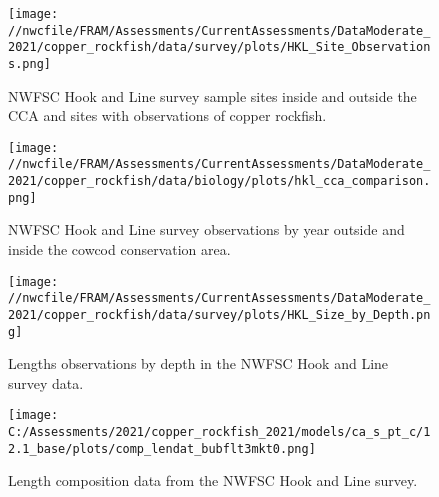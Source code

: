 \documentclass[11pt,
  english,
  a4paper,
]{article}
\begin{document}
\tagmcend\tagstructend


\begin{figure}
\centering
\texttt{[image: //nwcfile/FRAM/Assessments/CurrentAssessments/DataModerate\_2021/copper\_rockfish/data/survey/plots/HKL\_Site\_Observations.png]}
\caption{NWFSC Hook and Line survey sample sites inside and outside the CCA and sites with observations of copper rockfish.\label{fig:hkl-site-ob}}
\end{figure}

\tagmcend\tagstructend


\begin{figure}
\centering
\texttt{[image: //nwcfile/FRAM/Assessments/CurrentAssessments/DataModerate\_2021/copper\_rockfish/data/biology/plots/hkl\_cca\_comparison.png]}
\caption{NWFSC Hook and Line survey observations by year outside and inside the cowcod conservation area.\label{fig:hkl-cca}}
\end{figure}

\tagmcend\tagstructend


\begin{figure}
\centering
\texttt{[image: //nwcfile/FRAM/Assessments/CurrentAssessments/DataModerate\_2021/copper\_rockfish/data/survey/plots/HKL\_Size\_by\_Depth.png]}
\caption{Lengths observations by depth in the NWFSC Hook and Line survey data.\label{fig:hkl-len-dep}}
\end{figure}

\tagmcend\tagstructend


\begin{figure}
\centering
\texttt{[image: C:/Assessments/2021/copper\_rockfish\_2021/models/ca\_s\_pt\_c/12.1\_base/plots/comp\_lendat\_bubflt3mkt0.png]}
\caption{Length composition data from the NWFSC Hook and Line survey.\label{fig:hkl-len-data}}
\end{figure}

\tagmcend\tagstructend

\end{document}
